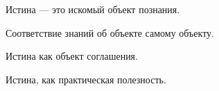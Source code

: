 Истина --- это искомый объект познания.

\begin{definition}
	Соответствие знаний об объекте самому объекту.
\end{definition}

\begin{definition}[Конвенциальное]
	Истина как объект соглашения.
\end{definition}

\begin{definition}[Прагматическая]
	Истина, как практическая полезность.
\end{definition}
